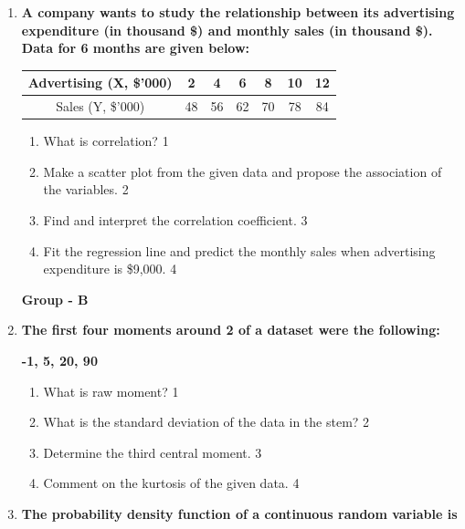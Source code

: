 \documentclass[12pt]{article}
\begin{document}
\begin{enumerate}
\item
  \textbf{A company wants to study the relationship between its advertising expenditure (in thousand \$) and monthly sales (in thousand \$). Data for 6 months are given below:}

\begin{table}[h!]
\centering
\begin{tabular}{c|c|c|c|c|c|c}
Advertising (X, \$'000) & 2 & 4 & 6 & 8 & 10 & 12 \\ \hline
Sales (Y, \$'000) & 48 & 56 & 62 & 70 & 78 & 84 \\
\end{tabular}
\end{table}

\begin{enumerate}
    \item What is correlation? \hfill 1
    \item Make a scatter plot from the given data and propose the association of the variables. \hfill 2
    \item
    Find and interpret the correlation coefficient. \hfill 3
    
    \item
    Fit the regression line and predict the monthly sales when advertising expenditure is \$9,000. \hfill 4
\end{enumerate}  

  \begin{center}
\textbf{Group  - B}
\end{center}

   \item
	  \textbf{The first four moments around 2 of a dataset were the following:}
	  
	  \begin{center}
	  \textbf{-1, 5, 20, 90}
	  \end{center}
  
  \begin{enumerate}
    \item
	What is raw moment? \hfill 1
    \item
	What is the standard deviation of the data in the stem? \hfill 2
    \item  
	Determine the third central moment. \hfill 3
    \item
	Comment on the kurtosis of the given data. \hfill 4
  \end{enumerate}

    \item
  \textbf{The probability density function of a continuous random variable is}


\end{enumerate}
\end{document}
